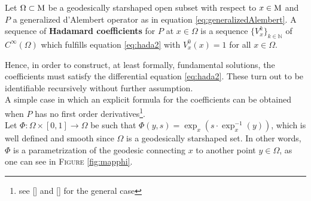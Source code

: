 \begin{definition}
	Let $\Omega\subset\mathrm{M}$ be a geodesically starshaped open subset with respect to $x\in\mathrm{M}$ and $P$ a generalized d'Alembert operator as in equation \eqref{eq:generalizedAlembert}. A sequence of \textbf{Hadamard coefficients} for $P$ at $x\in\Omega$ is a sequence $\{V_x^k\}_{k\in\mathbb{N}}$ of $C^\infty(\Omega)$ which fulfills equation \eqref{eq:hada2} with $V_x^0(x)=1$ for all $x\in\Omega$.
\end{definition}

\noindent Hence, in order to construct, at least formally, fundamental solutions, the coefficients must satisfy the differential equation \eqref{eq:hada2}. These turn out to be identifiable recursively without further assumption.\\
A simple case in which an explicit formula for the coefficients can be obtained when $P$ has no first order derivatives\footnote{see [\citealp[Prop 1]{ginoux}] and [\citealp[Prop 2.2.4]{bar2}] for the general case}.\\

\noindent Let $\Phi:\Omega\times[0,1]\to\Omega$ be such that $\Phi(y,s)=\exp_x(s\cdot\exp_x^{-1}(y))$, which is well defined and smooth since $\Omega$ is a geodesically starshaped set. In other words, $\Phi$ is a parametrization of the geodesic connecting $x$ to another point $y\in\Omega$, as one can see in \textsc{Figure} \ref{fig:mapphi}.

